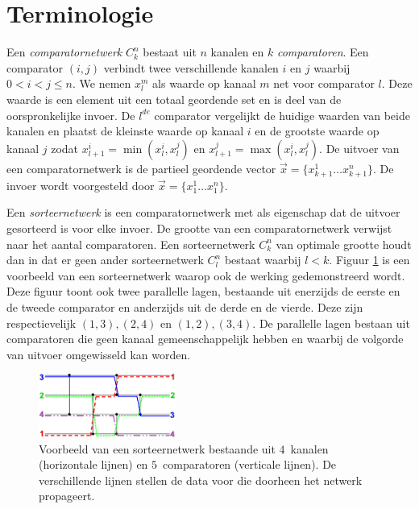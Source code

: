 \documentclass{article}
\begin{document}
\section{Terminologie}\label{terminologie}
Een \textit{comparatornetwerk} $C^n_k$ bestaat uit $n$ kanalen en $k$ \textit{comparatoren}.
Een comparator $\left(i, j\right)$ verbindt twee verschillende kanalen $i$ en $j$ waarbij $0 < i < j \leq n$.
We nemen $x_l^m$ als waarde op kanaal $m$ net voor comparator $l$.
Deze waarde is een element uit een totaal geordende set en is deel van de oorspronkelijke invoer. 
De $l^{de}$ comparator  vergelijkt de huidige waarden van beide kanalen en plaatst de kleinste waarde op kanaal $i$ en de grootste waarde op kanaal $j$ zodat $x_{l+1}^i = \min(x_l^i,x_l^j)$ en $x_{l+1}^j = \max(x_l^i,x_l^j)$.
De uitvoer van een comparatornetwerk is de partieel geordende vector $\vec{x} = \{x^1_{k+1} \dots x^n_{k+1} \} $.
De invoer wordt voorgesteld door $\vec{x} = \{x^1_{1} \dots x^n_{1} \} $. 

Een \textit{sorteernetwerk} is een comparatornetwerk met als eigenschap dat de uitvoer gesorteerd is voor elke invoer.
De grootte van een comparatornetwerk verwijst naar het aantal comparatoren. 
Een sorteernetwerk $C^n_k$ van optimale grootte houdt dan in dat er geen ander sorteernetwerk $C^n_l$ bestaat waarbij $l < k$.
Figuur \ref{Werking} is een voorbeeld van een sorteernetwerk waarop ook de werking gedemonstreerd wordt.
Deze figuur toont ook twee parallelle lagen, bestaande uit enerzijds de eerste en de tweede comparator en anderzijds uit de derde en de vierde.
Deze zijn respectievelijk $(1,3), (2,4)$ en $(1,2), (3,4)$.
De parallelle lagen bestaan uit comparatoren die geen kanaal gemeenschappelijk hebben en waarbij de volgorde van uitvoer omgewisseld kan worden.
\begin{figure}[!h]
	\centering
	\includegraphics[width=0.4\textwidth]{NetworkTransparent.png} 
	\caption{Voorbeeld van een sorteernetwerk bestaande uit $4$~kanalen (horizontale lijnen) en $5$~comparatoren (verticale lijnen). De verschillende lijnen stellen de data voor die doorheen het netwerk propageert.}
	\label{Werking}
\end{figure}
\end{document}
